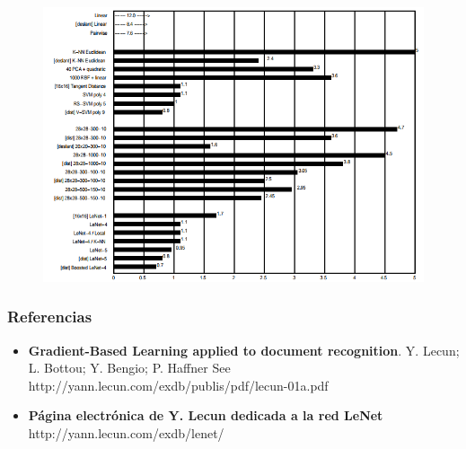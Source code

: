 \documentclass[xcolor=dvipsnames, compress]{beamer}
\begin{document}
\begin{frame}


	\begin{figure}
	\includegraphics[scale=0.4]{images/lenet.png}
\end{figure}

\end{frame}

\begin{frame}
\frametitle{Referencias}

\begin{itemize}
	\item \textbf{Gradient-Based Learning applied to document recognition}.  Y. Lecun; L. Bottou; Y. Bengio; P. Haffner See http://yann.lecun.com/exdb/publis/pdf/lecun-01a.pdf
	
	\item \textbf{Página electrónica de Y. Lecun dedicada a la red LeNet} http://yann.lecun.com/exdb/lenet/
\end{itemize}

\end{frame}


%
 
\end{document}
